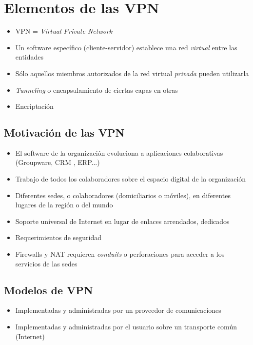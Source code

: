 
\section{Elementos de las VPN}
\begin{itemize}
	\item VPN = \emph{Virtual Private Network}
	\item Un software específico (cliente-servidor) establece una red \emph{virtual} entre las entidades
	\item Sólo aquellos miembros autorizados de la red virtual \emph{privada} pueden utilizarla
	\item \emph{Tunneling} o encapsulamiento de ciertas capas en otras
	\item Encriptación
\end{itemize}


\subsection{Motivación de las VPN}
\begin{itemize}
	\item El software de la organización evoluciona a aplicaciones colaborativas (Groupware, CRM , ERP...)
	\item Trabajo de todos los colaboradores sobre el espacio digital de la organización
	\item Diferentes sedes, o colaboradores (domiciliarios o móviles), en diferentes lugares de la región o del mundo
	\item Soporte universal de Internet en lugar de enlaces arrendados, dedicados
	\item Requerimientos de seguridad
	\item Firewalls y NAT requieren \emph{conduits} o perforaciones para acceder a los servicios de las sedes
 \end{itemize}



\subsection{Modelos de VPN}
\begin{itemize}
	\item Implementadas y administradas por un proveedor de comunicaciones
	\item Implementadas y administradas por el usuario sobre un transporte común (Internet)
\end{itemize}


